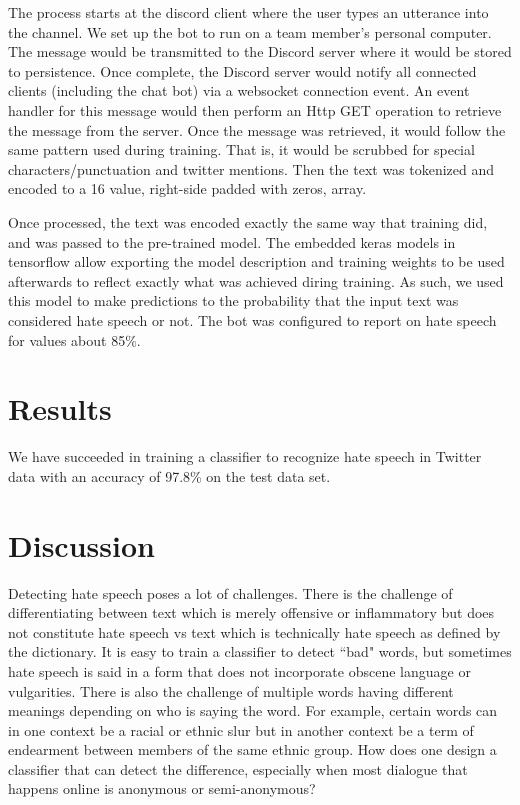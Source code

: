\documentclass[conference]{sig-alternate-05-2015}
\begin{document}
The process starts at the discord client where the user types an utterance into the channel.  We set up the bot to run on a team member's personal computer.  The message would be transmitted to the Discord server where it would be stored to persistence.  Once complete, the Discord server would notify all connected clients (including the chat bot) via a websocket connection event.  An event handler for this message would then perform an Http GET operation to retrieve the message from the server.  Once the message was retrieved, it would follow the same pattern used during training.  That is, it would be scrubbed for special characters/punctuation and twitter mentions.  Then the text was tokenized and encoded to a 16 value, right-side padded with zeros, array.

Once processed, the text was encoded exactly the same way that training did, and was passed to the pre-trained model.  The embedded keras models in tensorflow allow exporting the model description and training weights to be used afterwards to reflect exactly what was achieved diring training.  As such, we used this model to make predictions to the probability that the input text was considered hate speech or not.  The bot was configured to report on hate speech for values about 85\%.

\section{Results}

We have succeeded in training a classifier to recognize hate speech in Twitter data with an accuracy of 97.8\% on the test data set.




\section{Discussion}

Detecting hate speech poses a lot of challenges. There is the challenge of differentiating between text which is merely offensive or inflammatory but does not constitute hate speech vs text which is technically hate speech as defined by the dictionary. It is easy to train a classifier to detect ``bad" words, but sometimes hate speech is said in a form that does not incorporate obscene language or vulgarities. There is also the challenge of multiple words having different meanings depending on who is saying the word. For example, certain words can in one context be a racial or ethnic slur but in another context be a term of endearment between members of the same ethnic group. How does one design a classifier that can detect the difference, especially when most dialogue that happens online is anonymous or semi-anonymous?
\end{document}
